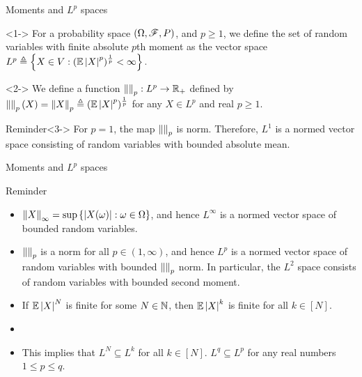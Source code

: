 \documentclass[12pt,aspectratio=169]{beamer}
\begin{document}
\begin{frame}{Moments and $L^p$ spaces}
\begin{Definition}<1->
For a probability space $(\Omega,\mathscr{F},P)$, and $p \ge 1$, 
we define the set of random variables with finite absolute $p$th moment as the vector space  
$
L^p \triangleq \left\{X \in V:(\mathbb{E}\left\lvert X\right\rvert^p)^{\frac{1}{p}} < \infty\right\}. 
$
\end{Definition}
\begin{Definition}<2->
We define a function $\left\lVert\right\rVert_p: L^p \to \mathbb{R}_+$ defined by $\left\lVert\right\rVert_p(X) = \left\lVert X\right\rVert_p \triangleq (\mathbb{E}\left\lvert X\right\rvert^p)^{\frac{1}{p}}$ for any $X \in L^p$ and real $p \ge 1$. 
\end{Definition}

\begin{block}{Reminder}<3->
For $p=1$, the map $\left\lVert\right\rVert_p$ is norm. 
Therefore, $L^1$ is a normed vector space consisting of random variables with bounded absolute mean.
\end{block}
\end{frame}

\begin{frame}{Moments and $L^p$ spaces}
\begin{block}{Reminder}
\begin{itemize}
\item <1-> $\left\lVert X\right\rVert_\infty = \sup\left\{\left\lvert X(\omega)\right\rvert:\omega\in \Omega\right\}$, 
and hence $L^\infty$ is a normed vector space of bounded random variables. 
\item <2-> $\left\lVert\right\rVert_p$ is a norm for all $p \in (1, \infty)$, 
and hence $L^p$ is a normed vector space of random variables with bounded $\left\lVert\right\rVert_p$ norm. 
In particular, the $L^2$ space consists of random variables with bounded second moment.

\item <3-> If $\mathbb{E}\left\lvert X\right\rvert^N$ is finite for some $N \in \mathbb{N}$, 
then $\mathbb{E}\left\lvert X\right\rvert^k$ is finite for all $k \in [N]$. 

\item <4-> 
\item <5-> This implies that $L^N \subseteq L^k$ for all $k \in [N]$. $L^{q} \subseteq L^p$ for any real numbers $1 \le p \le q$. 
\end{itemize}
\end{block}
\end{frame}
\end{document}

